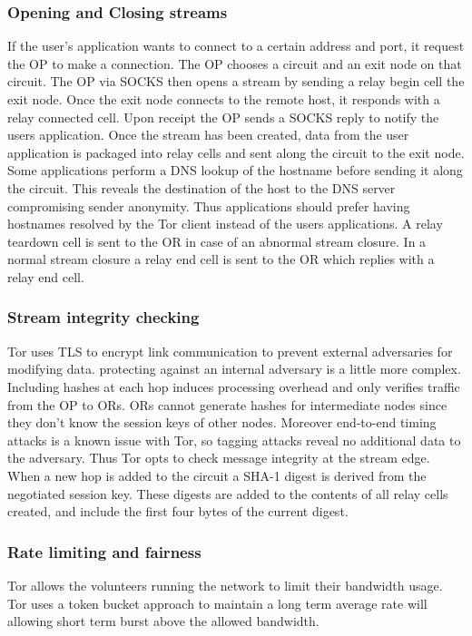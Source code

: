 \documentclass{llncs}
\begin{document}
\subsubsection{Opening and Closing streams}
If the user's application wants to connect to a certain address and port, it request the OP to make a connection. The OP chooses a circuit and an exit node on that circuit. The OP via SOCKS then opens a stream by sending a relay begin cell the exit node. Once the exit node connects to the remote host, it responds with a relay connected cell. Upon receipt the OP sends a SOCKS reply to notify the users application. Once the stream has been created, data from the user application is packaged into relay cells and sent along the circuit to the exit node.
Some applications perform a DNS lookup of the hostname before sending it along the circuit. This reveals the destination of the host to the DNS server compromising sender anonymity. Thus applications should prefer having hostnames resolved by the Tor client instead of the users applications.
A relay teardown cell is sent to the OR in case of an abnormal stream closure. In a normal stream closure a relay end cell is sent to the OR which replies with a relay end cell.

\subsubsection{Stream integrity checking}
Tor uses TLS to encrypt link communication to prevent external adversaries for modifying data. protecting against an internal adversary is a little more complex. Including hashes at each hop induces processing overhead and only verifies traffic from the OP to ORs. ORs cannot generate hashes for intermediate nodes since they don't know the session keys of other nodes. Moreover end-to-end timing attacks is a known issue with Tor, so tagging attacks reveal no additional data to the adversary.
Thus Tor opts to check message integrity at the stream edge. When a new hop is added to the circuit a SHA-1 digest is derived from the negotiated session key. These digests are added to the contents of all relay cells created, and include the first four bytes of the current digest.

\subsubsection{Rate limiting and fairness}
Tor allows the volunteers running the network to limit their bandwidth usage. Tor uses a token bucket approach to maintain a long term average rate will allowing short term burst above the allowed bandwidth.
\end{document}
